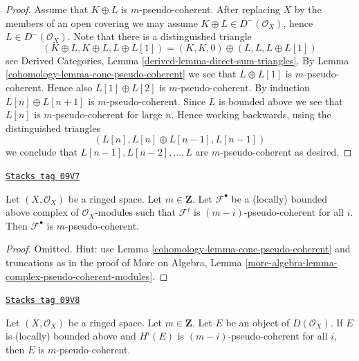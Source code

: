 \begin{proof}

Assume that $K \oplus L$ is $m$-pseudo-coherent.
After replacing $X$ by the members of an open covering we may
assume $K \oplus L \in D^-(\mathcal{O}_X)$, hence
$L \in D^-(\mathcal{O}_X)$.
Note that there is a distinguished triangle
$$
(K \oplus L, K \oplus L, L \oplus L[1]) =
(K, K, 0) \oplus (L, L, L \oplus L[1])
$$
see
Derived Categories, Lemma \ref{derived-lemma-direct-sum-triangles}.
By
Lemma \ref{cohomology-lemma-cone-pseudo-coherent}
we see that $L \oplus L[1]$ is $m$-pseudo-coherent.
Hence also $L[1] \oplus L[2]$ is $m$-pseudo-coherent.
By induction $L[n] \oplus L[n + 1]$ is $m$-pseudo-coherent.
Since $L$ is bounded above we see that $L[n]$ is $m$-pseudo-coherent
for large $n$. Hence working backwards, using the distinguished triangles
$$
(L[n], L[n] \oplus L[n - 1], L[n - 1])
$$
we conclude that $L[n - 1], L[n - 2], \ldots, L$ are $m$-pseudo-coherent
as desired.
\end{proof}

\begin{lemma}
\label{cohomology-lemma-complex-pseudo-coherent-modules}
\href{https://stacks.math.columbia.edu/tag/09V7}{\texttt{Stacks tag 09V7}}

Let $(X, \mathcal{O}_X)$ be a ringed space.
Let $m \in \mathbf{Z}$. Let $\mathcal{F}^\bullet$ be a (locally) bounded
above complex of $\mathcal{O}_X$-modules such that
$\mathcal{F}^i$ is $(m - i)$-pseudo-coherent for all $i$.
Then $\mathcal{F}^\bullet$ is $m$-pseudo-coherent.
\end{lemma}

\begin{proof}

Omitted. Hint: use Lemma \ref{cohomology-lemma-cone-pseudo-coherent} and truncations
as in the proof of
More on Algebra, Lemma \ref{more-algebra-lemma-complex-pseudo-coherent-modules}.
\end{proof}

\begin{lemma}
\label{cohomology-lemma-cohomology-pseudo-coherent}
\href{https://stacks.math.columbia.edu/tag/09V8}{\texttt{Stacks tag 09V8}}

Let $(X, \mathcal{O}_X)$ be a ringed space. Let $m \in \mathbf{Z}$. Let
$E$ be an object of $D(\mathcal{O}_X)$. If $E$ is (locally) bounded above
and $H^i(E)$ is $(m - i)$-pseudo-coherent for all $i$, then
$E$ is $m$-pseudo-coherent.
\end{lemma}

